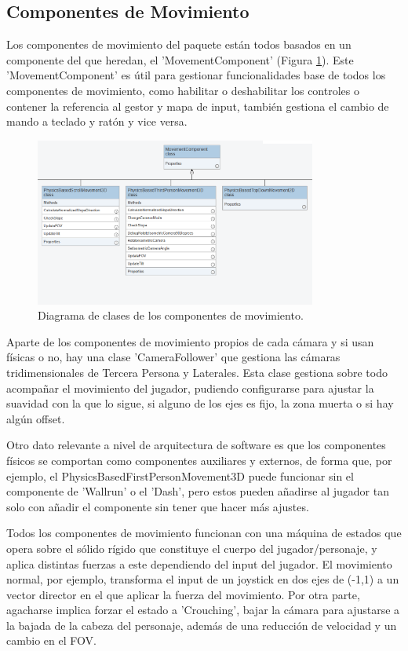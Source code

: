 \subsection{Componentes de Movimiento}
Los componentes de movimiento del paquete están todos basados en un componente del que heredan, el 'MovementComponent' (Figura \ref{fig:umlMovimiento}). Este 'MovementComponent' 
es útil para gestionar funcionalidades base de todos los componentes de movimiento, como habilitar o deshabilitar los controles o contener la referencia al gestor y mapa de input, 
también gestiona el cambio de mando a teclado y ratón y vice versa.

\begin{figure}[H]
  \centering
    \includegraphics[width=350px,clip=true]{Movement.png}
  \caption{Diagrama de clases de los componentes de movimiento.}
  \label{fig:umlMovimiento}
\end{figure}

Aparte de los componentes de movimiento propios de cada cámara y si usan físicas o no, hay una clase 'CameraFollower' que gestiona las cámaras tridimensionales de Tercera Persona 
y Laterales. Esta clase gestiona sobre todo acompañar el movimiento del jugador, pudiendo configurarse para ajustar la suavidad con la que lo sigue, si alguno de los ejes 
es fijo, la zona muerta o si hay algún offset.

Otro dato relevante a nivel de arquitectura de software es que los componentes físicos se comportan como componentes auxiliares y externos, de forma que, por ejemplo,
 el PhysicsBasedFirstPersonMovement3D puede funcionar sin el componente de 'Wallrun' o el 'Dash', pero estos pueden añadirse al jugador tan solo con añadir el componente sin
 tener que hacer más ajustes.
 
Todos los componentes de movimiento funcionan con una máquina de estados que opera sobre el sólido rígido que constituye el cuerpo del jugador/personaje, y aplica distintas 
fuerzas a este dependiendo del input del jugador. El movimiento normal, por ejemplo, transforma el input de un joystick en dos ejes de (-1,1) a un vector director en el que 
aplicar la fuerza del movimiento. Por otra parte, agacharse implica forzar el estado a 'Crouching', bajar la cámara para ajustarse a la bajada de la cabeza del personaje, además de una reducción de velocidad y
un cambio en el FOV.

